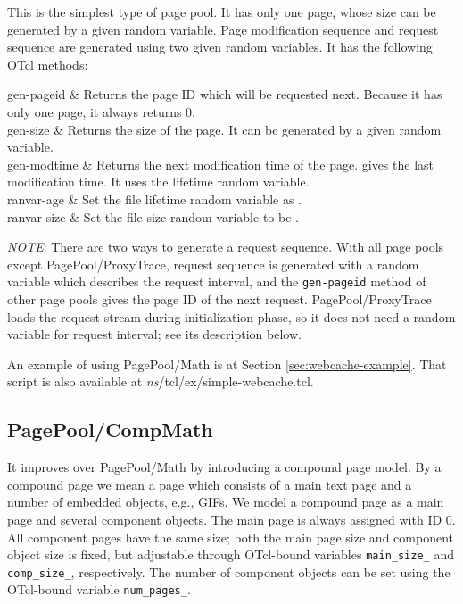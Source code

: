 This is the simplest type of page pool. It has only one page, whose
size can be generated by a given random variable. Page modification
sequence and request sequence are 
generated using two given random variables. It has the following OTcl
methods:

\begin{\par\tabular{\textwidth}{rX}}
gen-pageid & Returns the page ID which will be requested next. Because
 it has only one page, it always returns 0.\\

gen-size & Returns the size of the page. It can be generated by a
  given random variable. \\

gen-modtime   & Returns the next modification time of the
  page.  gives the last modification time. It uses the
  lifetime random variable. \\

ranvar-age  & Set the file lifetime random variable as
  . \\

ranvar-size  & Set the file size random variable to be
  . \\
\end{\par\tabular{\textwidth}{rX}}

{\em NOTE}: There are two ways to generate a request sequence. With
all page pools except PagePool/ProxyTrace, request sequence is
generated with a random variable which describes the request
interval, and the {\tt gen-pageid} method of other page pools gives
the page ID of the next request. PagePool/ProxyTrace loads the request
stream during initialization phase, so it does not need a random
variable for request interval; see its description below. 

An example of using PagePool/Math is at Section
\ref{sec:webcache-example}. That script is also available at 
\emph{ns}/tcl/ex/simple-webcache.tcl. 

\subsection{PagePool/CompMath}

It improves over PagePool/Math by introducing a compound page
model. By a compound page we mean a page which consists of a main text
page and a number of embedded objects, e.g., GIFs. We model a compound
page as a main page and several component objects. The main page is
always assigned with ID 0. All component pages
have the same size; both the main page size and component object size is
fixed, but adjustable through OTcl-bound variables {\tt main\_size\_}
and {\tt comp\_size\_}, respectively. The number of component objects
can be set using the OTcl-bound variable {\tt num\_pages\_}.

